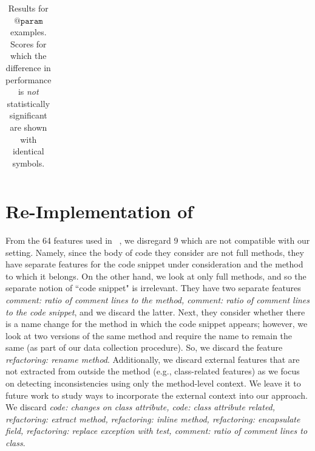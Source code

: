 \documentclass[letterpaper]{article} %
\makeatletter
\newcommand{\CodeIn}[1]{{\ifmmode{\mathtt{#1}}\else$\mathtt{#1}$\fi}}
\newcommand{\Param}{\CodeIn{@param}}
\makeatother
\begin{document}
\begin{table}[ht]
\begin{tabular}{ll@{\hskip 3mm}lllllllll}
\hline

\end{tabular}
\vspace{-5pt}
\caption{\label{table:param-table}Results for \Param{} examples. Scores for which the difference in performance is \textit{not} statistically significant are shown with identical symbols.}
\end{table}




\section{Re-Implementation of ~\citet{LiuOutdatedLine}}
\label{liu-et-al-reimplementation}
From the 64 features used in ~\citet{LiuOutdatedLine}, we disregard 9 which are not compatible with our setting. Namely, since the body of code they consider are not full methods, they have separate features for the code snippet under consideration and the method to which it belongs. On the other hand, we look at only full methods, and so the separate notion of ``code snippet" is irrelevant. They have two separate features \textit{comment: ratio of comment lines to the method, comment: ratio of comment lines to the code snippet}, and we discard the latter. Next, they consider whether there is a name change for the method in which the code snippet appears; however, we look at two versions of the same method and require the name to remain the same (as part of our data collection procedure). So, we discard the feature \textit{refactoring: rename method}. Additionally, we discard external features that are not extracted from outside the method (e.g., class-related features) as we focus on detecting inconsistencies using only the method-level context. We leave it to future work to study ways to incorporate the external context into our approach. We discard \textit{code: changes on class attribute, code: class attribute related, refactoring: extract method, refactoring: inline method, refactoring: encapsulate field, refactoring: replace exception with test, comment: ratio of comment lines to class}.
\end{document}
